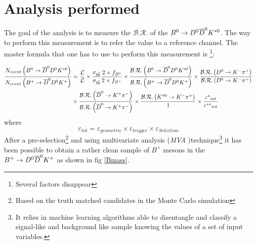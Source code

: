 \documentclass[11pt]{article}
\begin{document}
\section{Analysis performed}
The goal of the analysis is to measure the $\mathcal{B.R.}$ of the  $B^{0} \rightarrow D^0 \overline{D}^{0} K^{\ast 0}$. The way to perform this measurement is to refer the value to a reference channel. The master formula that one has to use to perform this measurement is \footnote{Several factors disappear}:

\tiny \begin{equation}\label{1}
\begin{split} 
\frac { { N }_{ event }\left( B^0\rightarrow \overline{D}^0 D^0 K^{\ast 0} \right)  }{ { N }_{ event }\left( B^+\rightarrow \overline{D}^0 D^0 K^{+} \right)  }&  = \frac{\mathcal{L}}{\mathcal{L}}\times \frac{\sigma_{b\overline{b}}}{\sigma_{b\overline{b}}}   \frac { 2 \times { f }_{ { B }^{ 0 } } }{ 2 \times { f }_{ { B }^{ + } } } \times \frac { \mathcal{B.R.}\left( B^0\rightarrow \overline{D}^0 D^0 K^{\ast 0} \right)  }{ \mathcal{B.R.}\left(B^+\rightarrow \overline{D}^0 D^0 K^{+} \right)  } \times \frac { \mathcal{B.R.}\left( D^{0} \rightarrow K^{-} \pi^{+} \right)  }{ \mathcal{B.R.}\left( D^{0} \rightarrow K^{-} \pi^{+} \right)  }  \\   & \times \frac { \mathcal{B.R.}\left( \overline{D}^0 \rightarrow K^+ \pi^- \right)  }{ \mathcal{B.R.}\left( \overline{D}^0 \rightarrow K^+ \pi^- \right)  } \times \frac { \mathcal{B.R.}\left( K^{\ast 0} \rightarrow K^- \pi^+ \right)  }{ 1 } \times \frac { { \varepsilon ^{\ast} }_{ tot } }{ {  \varepsilon^{\ast \ast} }_{ tot } }
\end{split} 
\end{equation}
\normalsize where
\tiny \begin{equation} \label{epsilon}
 \varepsilon_{ tot } = \varepsilon_{geometric}\times \varepsilon_{trigger}\times \varepsilon_{Selection}
\end{equation}
\normalsize After a pre-selection\footnote{Based on the truth matched candidates in the Monte Carlo simulation} and using multivariate analysis (\textit{MVA} )technique\footnote{It relies in machine learning algorithms able to disentangle and classify a signal-like and background like sample knowing the values of a set of input variables.} it has been possible to obtain a rather clean sample of $B^{+}$ mesons in the $B^{+} \rightarrow D^0 \overline{D}^{0} K^{+}$ as shown in fig \ref{Bmass}.
\end{document}
